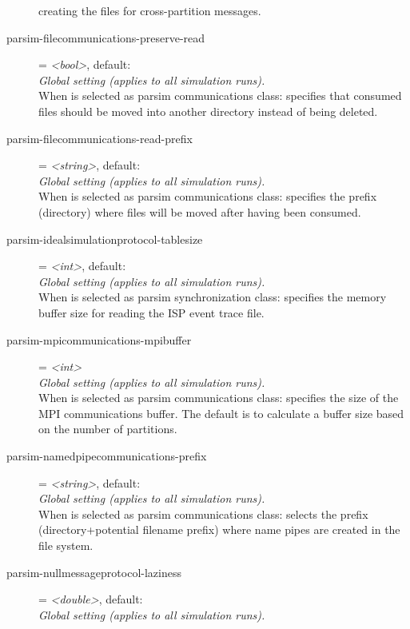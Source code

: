 \begin{description}
    creating the files for cross-partition messages.
\item[parsim-filecommunications-preserve-read] = \textit{<bool>}, default: \\
    \textit{Global setting (applies to all simulation runs).}\\
    When  is selected as parsim communications
    class: specifies that consumed files should be moved into another directory
    instead of being deleted.
\item[parsim-filecommunications-read-prefix] = \textit{<string>}, default: \\
    \textit{Global setting (applies to all simulation runs).}\\
    When  is selected as parsim communications
    class: specifies the prefix (directory) where files will be moved after
    having been consumed.
\item[parsim-idealsimulationprotocol-tablesize] = \textit{<int>}, default: \\
    \textit{Global setting (applies to all simulation runs).}\\
    When  is selected as parsim
    synchronization class: specifies the memory buffer size for reading the ISP
    event trace file.
\item[parsim-mpicommunications-mpibuffer] = \textit{<int>}\\
    \textit{Global setting (applies to all simulation runs).}\\
    When  is selected as parsim communications class:
    specifies the size of the MPI communications buffer. The default is to
    calculate a buffer size based on the number of partitions.
\item[parsim-namedpipecommunications-prefix] = \textit{<string>}, default: \\
    \textit{Global setting (applies to all simulation runs).}\\
    When  is selected as parsim
    communications class: selects the prefix (directory+potential filename
    prefix) where name pipes are created in the file system.
\item[parsim-nullmessageprotocol-laziness] = \textit{<double>}, default: \\
    \textit{Global setting (applies to all simulation runs).}\\

\end{description}
